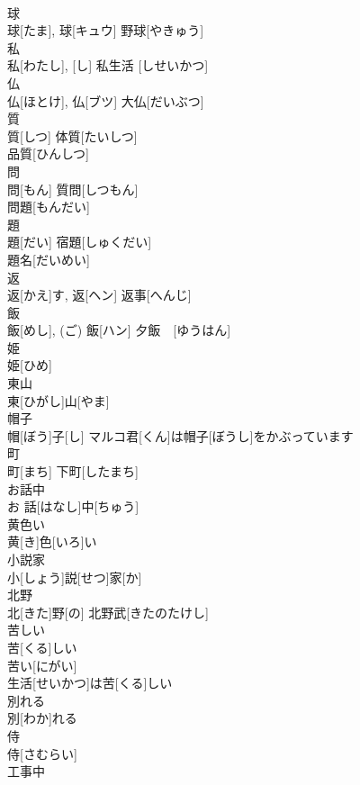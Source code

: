 \documentclass[8pt]{extreport}
\begin{document}
\begin{CJK}{UTF8}{min}
\\	球	
\\	球[たま], 球[キュウ]	野球[やきゅう]　
\\	私	
\\	私[わたし], [し]	私生活 [しせいかつ] 
\\	仏	
\\	仏[ほとけ], 仏[ブツ]	大仏[だいぶつ] 
\\	質	
\\	質[しつ]	体質[たいしつ] 
\\	品質[ひんしつ] 
\\	問	
\\	問[もん]	質問[しつもん] 
\\	問題[もんだい] 
\\	題	
\\	題[だい]	宿題[しゅくだい] 
\\	題名[だいめい] 
\\	返	
\\	返[かえ]す, 返[ヘン]	返事[へんじ] 
\\	飯	
\\	飯[めし], (ご) 飯[ハン]	夕飯　[ゆうはん] 
\\	姫	
\\	姫[ひめ]	
\\	東山	
\\	東[ひがし]山[やま]	
\\	帽子	
\\	帽[ぼう]子[し]	マルコ君[くん]は帽子[ぼうし]をかぶっています　
\\	町	
\\	町[まち]	下町[したまち] 
\\	お話中	
\\	お 話[はなし]中[ちゅう]	
\\	黄色い	
\\	黄[き]色[いろ]い	
\\	小説家	
\\	小[しょう]説[せつ]家[か]	
\\	北野	
\\	北[きた]野[の]	北野武[きたのたけし]　
\\	苦しい	
\\	苦[くる]しい	
\\	苦い[にがい]　
\\	生活[せいかつ]は苦[くる]しい 
\\	別れる	
\\	別[わか]れる	
\\	侍	
\\	侍[さむらい]	
\\	工事中	

\end{CJK}
\end{document}
